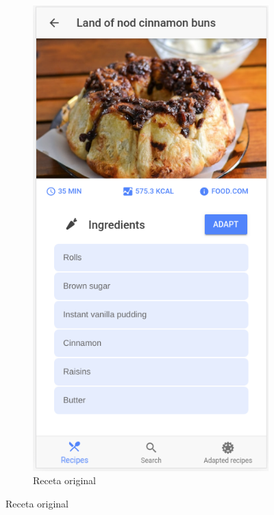 \begin{figure}[H]
    \centering

    \begin{subfigure}[b]{0.30\linewidth}
        \includegraphics[width=\linewidth]{imagenes/app/pantallas/ejemplo1.png}
        \caption{Receta original}

\end{subfigure}
\end{figure}
